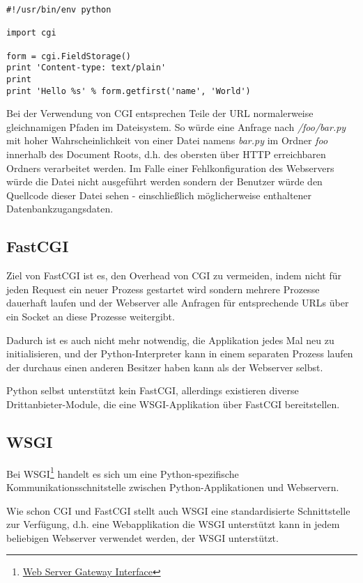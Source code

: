 \begin{lstlisting}[caption=Python-CGI-Script,label=lst:python-cgi]
#!/usr/bin/env python

import cgi

form = cgi.FieldStorage()
print 'Content-type: text/plain'
print
print 'Hello %s' % form.getfirst('name', 'World')
\end{lstlisting}

Bei der Verwendung von CGI entsprechen Teile der URL normalerweise gleichnamigen Pfaden im
Dateisystem. So würde eine Anfrage nach \emph{/foo/bar.py} mit hoher Wahrscheinlichkeit von einer
Datei namens \emph{bar.py} im Ordner \emph{foo} innerhalb des Document Roots, d.h. des obersten über
HTTP erreichbaren Ordners verarbeitet werden. Im Falle einer Fehlkonfiguration des Webservers würde
die Datei nicht ausgeführt werden sondern der Benutzer würde den Quellcode dieser Datei sehen -
einschließlich möglicherweise enthaltener Datenbankzugangsdaten.

\subsection{FastCGI}

Ziel von FastCGI ist es, den Overhead von CGI zu vermeiden, indem nicht für jeden Request ein neuer
Prozess gestartet wird sondern mehrere Prozesse dauerhaft laufen und der Webserver alle Anfragen für
entsprechende URLs über ein Socket an diese Prozesse weitergibt.

Dadurch ist es auch nicht mehr notwendig, die Applikation jedes Mal neu zu initialisieren, und der
Python-Interpreter kann in einem separaten Prozess laufen der durchaus einen anderen Besitzer haben
kann als der Webserver selbst.

Python selbst unterstützt kein FastCGI, allerdings existieren diverse Drittanbieter-Module, die
eine WSGI-Applikation über FastCGI bereitstellen.

\subsection{WSGI}

Bei WSGI\footnote{\href{http://www.python.org/dev/peps/pep-0333/}{Web Server Gateway Interface}}
handelt es sich um eine Python-spezifische Kommunikationsschnitstelle zwischen Python-Applikationen
und Webservern.

Wie schon CGI und FastCGI stellt auch WSGI eine standardisierte Schnittstelle zur Verfügung, d.h.
eine Webapplikation die WSGI unterstützt kann in jedem beliebigen Webserver verwendet werden, der
WSGI unterstützt.

